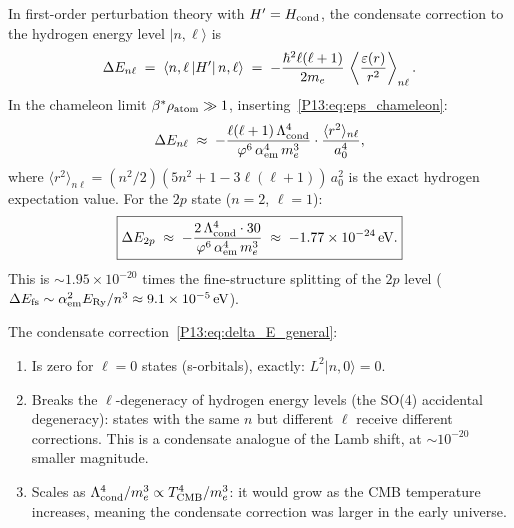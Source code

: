 \begin{proposition}
\label{P13:prop:energy_correction}
In first-order perturbation theory with $H' = H_{\mathrm{cond}}$,
the condensate correction to the hydrogen energy level $|n,\ell\rangle$ is
\begin{equation}
  \Delta E_{n\ell}
  \;=\; \left\langle n,\ell\left|H'\right|n,\ell\right\rangle
  \;=\; -\frac{\hbar^2\ell(\ell+1)}{2m_e}\,
        \left\langle\frac{\varepsilon(r)}{r^2}\right\rangle_{n\ell}.
  \label{P13:eq:delta_E_general}
\end{equation}
In the chameleon limit $\beta^{*}\rho_{\mathrm{atom}}\gg1$, inserting~\eqref{P13:eq:eps_chameleon}:
\begin{equation}
  \Delta E_{n\ell}
  \;\approx\; -\frac{\ell(\ell+1)\,\Lambda_{\mathrm{cond}}^4}{\varphi^6\,\alpha_{\mathrm{em}}^4\,m_e^3}
              \cdot\frac{\langle r^2\rangle_{n\ell}}{a_0^4},
\end{equation}
where $\langle r^2\rangle_{n\ell} = (n^2/2)(5n^2+1-3\ell(\ell+1))\,a_0^2$
is the exact hydrogen expectation value.
For the $2p$ state ($n=2$, $\ell=1$):
\begin{equation}
  \boxed{\Delta E_{2p}
  \;\approx\; -\frac{2\,\Lambda_{\mathrm{cond}}^4\cdot30}{\varphi^6\,\alpha_{\mathrm{em}}^4\,m_e^3}
  \;\approx\; -1.77\times10^{-24}\,\mathrm{eV}.}
  \label{P13:eq:delta_E_2p}
\end{equation}
This is $\sim1.95\times10^{-20}$ times the fine-structure
splitting of the $2p$ level
($\Delta E_{\rm fs}\sim\alpha_{\mathrm{em}}^2E_{\mathrm{Ry}}/n^3\approx9.1\times10^{-5}\,\mathrm{eV}$).
\end{proposition}

\begin{remark}
\label{P13:rem:structure}
The condensate correction~\eqref{P13:eq:delta_E_general}:
\begin{enumerate}[noitemsep]
\item Is zero for $\ell=0$ states (s-orbitals), exactly:
  $L^2|n,0\rangle = 0$.
\item Breaks the $\ell$-degeneracy of hydrogen energy levels
  (the SO(4) accidental degeneracy): states with the same $n$
  but different $\ell$ receive different corrections.
  This is a condensate analogue of the Lamb shift, at $\sim10^{-20}$
  smaller magnitude.
\item Scales as $\Lambda_{\mathrm{cond}}^4/m_e^3 \propto T_{\mathrm{CMB}}^4/m_e^3$:
  it would grow as the CMB temperature increases, meaning the
  condensate correction was larger in the early universe.
\end{enumerate}
\end{remark}

